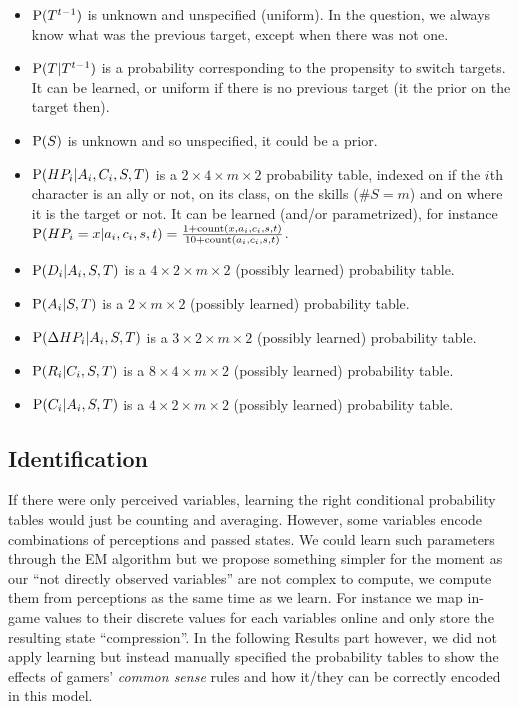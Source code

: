 \begin{itemize}
    \item $\mathrm{P}(T^{t-1})$ is unknown and unspecified (uniform). In the question, we always know what was the previous target, except when there was not one.
    \item $\mathrm{P}(T|T^{t-1})$ is a probability corresponding to the propensity to switch targets. It can be learned, or uniform if there is no previous target (it the prior on the target then).
    \item $\mathrm{P}(S)$ is unknown and so unspecified, it could be a prior.
    \item $\mathrm{P}(HP_i | A_i, C_i, S, T)$ is a $2\times4\times m \times 2$ probability table, indexed on if the $i$th character is an ally or not, on its class, on the skills ($\#S=m$) and on where it is the target or not. It can be learned (and/or parametrized), for instance $\mathrm{P}(HP_i=x|a_i,c_i,s,t)=\frac{1+\mathrm{count}(x,a_i,c_i,s,t)}{10+\mathrm{count}(a_i,c_i,s,t)}$.
    \item $\mathrm{P}(D_i | A_i, S, T)$ is a $4\times2 \times m \times 2$ (possibly learned) probability table.
    \item $\mathrm{P}(A_i | S, T)$ is a $2 \times m \times 2$ (possibly learned) probability table.
    \item $\mathrm{P}(\Delta HP_i | A_i, S, T)$ is a $3 \times 2 \times m \times 2$ (possibly learned) probability table.
    \item $\mathrm{P}(R_i | C_i, S, T)$ is a $8 \times 4 \times m \times 2$ (possibly learned) probability table.
    \item $\mathrm{P}(C_i | A_i, S, T)$ is a $4 \times 2 \times m \times 2$ (possibly learned) probability table.
\end{itemize}

\subsection{Identification}

If there were only perceived variables, learning the right conditional probability tables would just be counting and averaging. However, some variables encode combinations of perceptions and passed states. We could learn such parameters through the EM algorithm but we propose something simpler for the moment as our ``not directly observed variables'' are not complex to compute, we compute them from perceptions as the same time as we learn. For instance we map in-game values to their discrete values for each variables online and only store the resulting state ``compression''. In the following Results part however, we did not apply learning but instead manually specified the probability tables to show the effects of gamers' \textit{common sense} rules and how it/they can be correctly encoded in this model.

